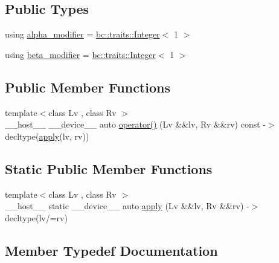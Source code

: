 \subsection*{Public Types}
\begin{DoxyCompactItemize}
\item 
using \hyperlink{structbc_1_1oper_1_1Div__Assign_a3ee36b5ca9c50bbaa7cedf38da7dae7e}{alpha\+\_\+modifier} = \hyperlink{structbc_1_1traits_1_1Integer}{bc\+::traits\+::\+Integer}$<$ 1 $>$
\item 
using \hyperlink{structbc_1_1oper_1_1Div__Assign_a90bbb13282a3f046385a9b92a02ee446}{beta\+\_\+modifier} = \hyperlink{structbc_1_1traits_1_1Integer}{bc\+::traits\+::\+Integer}$<$ 1 $>$
\end{DoxyCompactItemize}
\subsection*{Public Member Functions}
\begin{DoxyCompactItemize}
\item 
{\footnotesize template$<$class Lv , class Rv $>$ }\\\+\_\+\+\_\+host\+\_\+\+\_\+ \+\_\+\+\_\+device\+\_\+\+\_\+ auto \hyperlink{structbc_1_1oper_1_1Div__Assign_a7c0a7d535ddd10949839fad279d746af}{operator()} (Lv \&\&lv, Rv \&\&rv) const -\/$>$ decltype(\hyperlink{structbc_1_1oper_1_1Div__Assign_a0baa46adbdde01c10dd58ce3d02bc62f}{apply}(lv, rv))
\end{DoxyCompactItemize}
\subsection*{Static Public Member Functions}
\begin{DoxyCompactItemize}
\item 
{\footnotesize template$<$class Lv , class Rv $>$ }\\\+\_\+\+\_\+host\+\_\+\+\_\+ static \+\_\+\+\_\+device\+\_\+\+\_\+ auto \hyperlink{structbc_1_1oper_1_1Div__Assign_a0baa46adbdde01c10dd58ce3d02bc62f}{apply} (Lv \&\&lv, Rv \&\&rv) -\/$>$ decltype(lv/=rv)
\end{DoxyCompactItemize}


\subsection{Member Typedef Documentation}
\mbox{\label{structbc_1_1oper_1_1Div__Assign_a3ee36b5ca9c50bbaa7cedf38da7dae7e}} 
